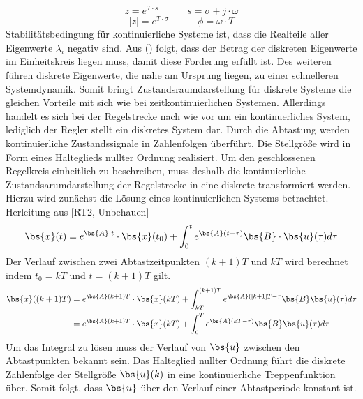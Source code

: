\begin{equation}
z = e^{T\cdot s} \hspace{35pt} s = \sigma + j\cdot \omega
\end{equation}
\begin{equation}
\vert z \vert = e^{T\cdot \sigma} \hspace{35pt} \phi = \omega\cdot T
\label{eq_abs_z}
\end{equation}
Stabilitätsbedingung für kontinuierliche Systeme ist, dass die Realteile aller Eigenwerte $\lambda_i$ negativ sind. Aus (\cite{eq_abs_z}) folgt, dass der Betrag der diskreten Eigenwerte im Einheitskreis liegen muss, damit diese Forderung erfüllt ist. Des weiteren führen diskrete Eigenwerte, die nahe am Ursprung liegen, zu einer schnelleren Systemdynamik. Somit bringt Zustandsraumdarstellung für diskrete Systeme die gleichen Vorteile mit sich wie bei zeitkontinuierlichen Systemen.
Allerdings handelt es sich bei der Regelstrecke nach wie vor um ein kontinuerliches System, lediglich der Regler stellt ein diskretes System dar. Durch die Abtastung werden kontinuierliche Zustandssignale in Zahlenfolgen überführt. Die Stellgröße wird in Form eines Halteglieds nullter Ordnung realisiert. Um den geschlossenen Regelkreis einheitlich zu beschreiben, muss deshalb die kontinuierliche Zustandsarumdarstellung der Regelstrecke in eine diskrete transformiert werden. Hierzu wird zunächst die Lösung eines kontinuierlichen Systems  betrachtet. Herleitung aus [RT2, Unbehauen]
\begin{equation}
\bs{x}(t) = e^{\bs{A}\cdot t}\cdot \bs{x}(t_0) + \int^t_0 e^{\bs{A}(t-\tau)}\bs{B}\cdot \bs{u}(\tau)d\tau
\end{equation}
Der Verlauf zwischen zwei Abtastzeitpunkten $(k+1)T$ und $kT$ wird berechnet indem $t_0=kT$ und $t=(k+1)T$ gilt.
\begin{equation}
\begin{split}
\bs{x}( (k+1)T) &= e^{\bs{A}(k+1)T}\cdot \bs{x}(kT) + \int^{(k+1)T}_{kT} e^{\bs{A}([k+1]T-\tau}\bs{B}\bs{u}(\tau)d\tau \\
&= e^{\bs{A}(k+1)T}\cdot \bs{x}(kT) + \int^T_0 e^{\bs{A}(kT-\tau)}\bs{B}\bs{u}(\tau)d\tau
\end{split}
\end{equation}
Um das Integral zu lösen muss der Verlauf von $\bs{u}$ zwischen den Abtastpunkten bekannt sein. Das Halteglied nullter Ordnung führt die diskrete Zahlenfolge der Stellgröße $\bs{u}(k)$ in eine kontinuierliche Treppenfunktion über. Somit folgt, dass $\bs{u}$ über den Verlauf einer Abtastperiode konstant ist.
